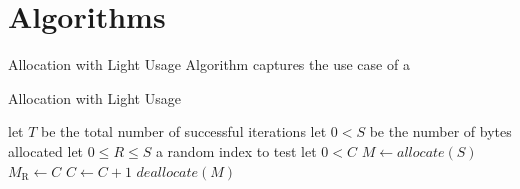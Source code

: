 \documentclass[letterpaper, 10 pt, conference]{ieeeconf}  %
\begin{document}
\section{Algorithms}

Allocation with Light Usage Algorithm captures the use case of a 


\begin{algorithm}[h]
\caption{Allocation with Light Usage}
\begin{algorithmic}
\STATE let $T$ be the total number of successful iterations
\STATE let $0 < S$ be the number of bytes allocated
\STATE let $0 \leq R \leq S$ a random index to test
\STATE let $0 < C$
  \STATE $M \leftarrow allocate(S)$
  \STATE $M_\text{R} \leftarrow C$
  \STATE $C \leftarrow C + 1$
  \ENDIF
  \STATE $deallocate(M)$
\ENDWHILE
\end{algorithmic}
\label{light_usage_algorithm}
\end{algorithm}


\end{document}
